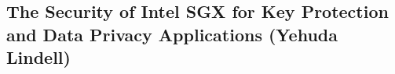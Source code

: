 \subsection{The Security of Intel SGX for Key Protection and Data Privacy Applications (Yehuda Lindell)}

